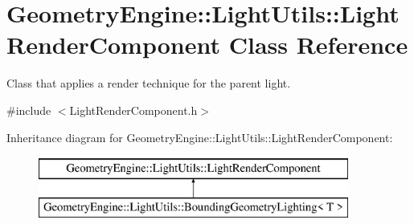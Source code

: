 \hypertarget{class_geometry_engine_1_1_light_utils_1_1_light_render_component}{}\section{Geometry\+Engine\+::Light\+Utils\+::Light\+Render\+Component Class Reference}
\label{class_geometry_engine_1_1_light_utils_1_1_light_render_component}


Class that applies a render technique for the parent light.  




{\ttfamily \#include $<$Light\+Render\+Component.\+h$>$}

Inheritance diagram for Geometry\+Engine\+::Light\+Utils\+::Light\+Render\+Component\+:\begin{figure}[H]
\begin{center}
\leavevmode
\includegraphics[height=2.000000cm]{class_geometry_engine_1_1_light_utils_1_1_light_render_component}
\end{center}
\end{figure}
